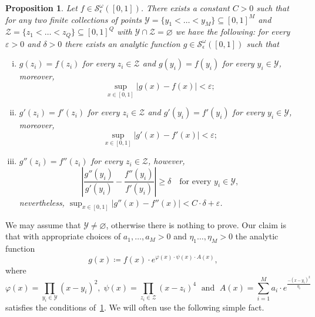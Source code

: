 \documentclass[11pt,]{article}
\def\cref#1{\ref{#1}}%
\newtheorem{proposition}[theorem]{Proposition}
\theoremstyle{definition}
\theoremstyle{remark}
\newcommand{\0}{\mathbf{0}}
\begin{document}
\begin{proposition}\label{prop:AnalyticBumpFunc}
Let $f\in \mathcal{S}^{\omega}_\epsilon([0,1])$. There exists a constant $C>0$ such that for
any two finite collections of points
$\mathcal{Y}=\{y_1<\ldots<y_M\}\subseteq[0,1]^M$ and $\mathcal{Z}=\{z_1<\ldots<
z_Q\}\subseteq[0,1]^Q$ with $\mathcal{Y}\cap\mathcal{Z}=\varnothing$ we have the following: for
every $\varepsilon>0$ and $\delta>0$ there exists an analytic function
$g\in\mathcal{S}^{\omega}_\epsilon([0,1])$ such that
\begin{enumerate}[(i)]
\item $g(z_i)=f(z_i)$ for every $z_i\in\mathcal{Z}$ and $g(y_i)=f(y_i)$ for every $y_i\in\mathcal{Y}$, moreover,
\begin{equation*}
\sup_{x\in[0,1]}|g(x)-f(x)|<\varepsilon;
\end{equation*}
\item  $g'(z_i)=f'(z_i)$ for every $z_i\in\mathcal{Z}$ and $g'(y_i)=f'(y_i)$ for every $y_i\in\mathcal{Y}$, moreover,
\begin{equation*}
	\sup_{x\in[0,1]}|g'(x)-f'(x)|<\varepsilon;
\end{equation*}
\item $g''(z_i)=f''(z_i)$ for every $z_i\in\mathcal{Z}$, however,
\begin{equation*}
	\left| \frac{g''(y_i)}{g'(y_i)} - \frac{f''(y_i)}{f'(y_i)} \right|\geq \delta \quad\text{
	for every } y_i\in\mathcal{Y},
\end{equation*}
nevertheless, $	\sup_{x\in[0,1]}|g''(x)-f''(x)|<C\cdot \delta +\varepsilon$.
\end{enumerate}
\end{proposition}

We may assume that $\mathcal{Y}\neq\varnothing$, otherwise there is nothing to prove. Our claim is
that with appropriate choices of $a_1,\ldots,a_M>0$ and $\eta_1\ldots,\eta_M>0$ the analytic
function
\begin{equation}\label{eq:BumpFunc}
g(x)\coloneqq f(x)\cdot e^{\varphi(x)\cdot \psi(x)\cdot A(x)},
\end{equation} 
where
\begin{equation*}
\varphi(x)=\prod_{y_i\in\mathcal{Y}} (x-y_i)^2,\; \psi(x) = \prod_{z_i\in\mathcal{Z}} (x-z_i)^4
\;\text{ and }\; A(x)= \sum_{i=1}^{M} a_i\cdot e^{\frac{-(x-y_i)^2}{\eta_i}}
\end{equation*}
satisfies the conditions of~\cref{prop:AnalyticBumpFunc}. We will often use the following simple fact.
\end{document}
